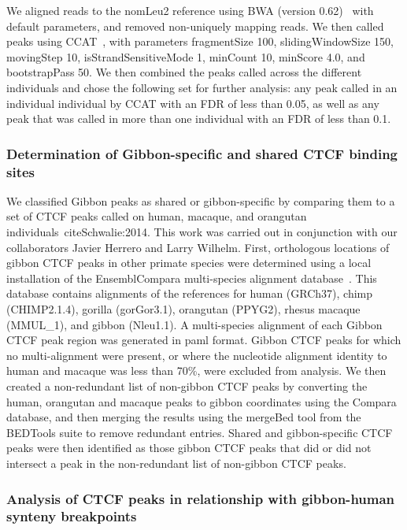 We aligned reads to the nomLeu2 reference using BWA (version 0.62)~\cite{Li:2009p836} with default parameters, and removed non-uniquely mapping reads. We then called peaks using CCAT~\cite{Xu:2010fu}, with parameters fragmentSize 100, slidingWindowSize 150, movingStep 10, isStrandSensitiveMode 1, minCount 10, minScore 4.0, and bootstrapPass 50. We then combined the peaks called across the different individuals and chose the following set for further analysis: any peak called in an individual individual by CCAT with an FDR of less than 0.05, as well as any peak that was called in more than one individual with an FDR of less than 0.1. 

\subsubsection{Determination of Gibbon-specific and shared CTCF binding sites}

We classified Gibbon peaks as shared or gibbon-specific by comparing them to a set of CTCF peaks called on human, macaque, and orangutan individuals~cite{Schwalie:2014}. This work was carried out in conjunction with our collaborators Javier Herrero and Larry Wilhelm. First, orthologous locations of gibbon CTCF peaks in other primate species were determined using a local installation of the EnsemblCompara multi-species alignment database~\cite{ensembl_compara,Vilella:2009ju}. This database contains alignments of the references for human (GRCh37), chimp (CHIMP2.1.4), gorilla (gorGor3.1), orangutan (PPYG2), rhesus macaque (MMUL\_1), and gibbon (Nleu1.1). A multi-species alignment of each Gibbon CTCF peak region was generated in paml format. Gibbon CTCF peaks for which no multi-alignment were present, or where the nucleotide alignment identity to human and macaque was less than 70\%, were excluded from analysis. We then created a non-redundant list of non-gibbon CTCF peaks by converting the human, orangutan and macaque peaks to gibbon coordinates using the Compara database, and then merging the results using the mergeBed tool from the BEDTools suite to remove redundant entries. Shared and gibbon-specific CTCF peaks were then identified as those gibbon CTCF peaks that did or did not intersect a peak in the non-redundant list of non-gibbon CTCF peaks.

\subsubsection{Analysis of CTCF peaks in relationship with gibbon-human synteny breakpoints}

